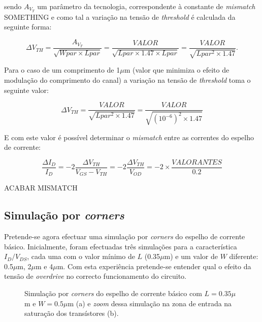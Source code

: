 \documentclass[11pt]{article}
\numberwithin{equation}{section}
\begin{document}
\vspace{1mm}
sendo $A_{V_{T}}$ um parâmetro da tecnologia, correspondente à constante de \textit{mismatch} SOMETHING e como tal a variação na tensão de \textit{threshold} é calculada da seguinte forma:

\vspace{-3mm}
\begin{equation}
\Delta V_{TH} = \frac{A_{V_{T}}}{\sqrt{Wpar \times Lpar}} = \frac{VALOR}{\sqrt{Lpar \times 1.47 \times Lpar}} = \frac{VALOR}{\sqrt{Lpar ^2\times 1.47}}.
\end{equation}

\vspace{1mm}
Para o caso de um comprimento de 1$\mu$m (valor que minimiza o efeito de modulação do comprimento do canal) a variação na tensão de \textit{threshold} toma o seguinte valor:

\vspace{-3mm}
\begin{equation}
\Delta V_{TH} = \frac{VALOR}{\sqrt{Lpar ^2\times 1.47}} = \frac{VALOR}{\sqrt{(10^{-6})^2\times 1.47}}
\end{equation}

\vspace{1mm}
E com este valor é possível determinar o \textit{mismatch} entre as correntes do espelho de corrente:

\vspace{-3mm}
\begin{equation}
\frac{\Delta I_{D}}{I_{D}} = - 2 \frac{\Delta V_{TH}}{V_{GS}-V_{TH}} = - 2 \frac{\Delta V_{TH}}{V_{OD}} = - 2 \times \frac{VALOR ANTES}{0.2}
\end{equation}

\vspace{1mm}
ACABAR MISMATCH

\subsection{Simulação por \textit{corners}}

Pretende-se agora efectuar uma simulação por \textit{corners} do espelho de corrente básico. Inicialmente, foram efectuadas três simulações para a característica $I_{D}/V_{DS}$, cada uma com o valor mínimo de $L$ (0.35$\mu$m) e um valor de $W$ diferente: 0.5$\mu$m, 2$\mu$m e 4$\mu$m. Com esta experiência pretende-se entender qual o efeito da tensão de \textit{overdrive} no correcto funcionamento do circuito.

\begin{figure}[H]
	\centering
	\hspace*{-0.8cm}
	\hspace*{0.5cm}
	\vspace{-0.8em}
	\caption{Simulação por \textit{corners} do espelho de corrente básico com $L = 0.35\mu$m e $W = 0.5\mu$m (a) e \textit{zoom} dessa simulação na zona de entrada na saturação dos transístores (b).}
	\vspace{-0.8em}
\end{figure}
\end{document}
